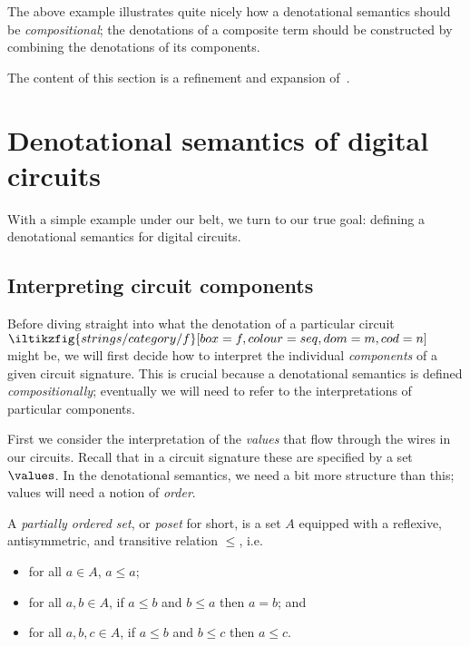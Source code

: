 The above example illustrates quite nicely how a denotational semantics should
be \emph{compositional}; the denotations of a composite term should be
constructed by combining the denotations of its components.

\begin{remark}
    The content of this section is a refinement and expansion
    of~\cite[Section 3]{ghica2023compositional}.
\end{remark}

\section{Denotational semantics of digital circuits}

With a simple example under our belt, we turn to our true goal: defining a
denotational semantics for digital circuits.

\subsection{Interpreting circuit components}

Before diving straight into what the denotation of a particular circuit \(
    \iltikzfig{strings/category/f}[box=f,colour=seq,dom=m,cod=n]
\) might be, we will first decide how to interpret the individual
\emph{components} of a given circuit signature.
This is crucial because a denotational semantics is defined
\emph{compositionally}; eventually we will need to refer to the interpretations
of particular components.

First we consider the interpretation of the \emph{values} that flow through the
wires in our circuits.
Recall that in a circuit signature these are specified by a set \(\values\).
In the denotational semantics, we need a bit more structure than this; values
will need a notion of \emph{order}.

\begin{definition}
    A \emph{partially ordered set}, or \emph{poset} for short, is a set \(A\)
    equipped with a reflexive, antisymmetric, and transitive relation \(\leq\),
    i.e.\
    \begin{itemize}
        \item for all \(a \in A\), \(a \leq a\);
        \item for all \(a, b \in A\), if \(a \leq b\) and \(b \leq a\) then
                \(a = b\); and
        \item for all \(a, b, c \in A\), if \(a \leq b\) and \(b \leq c\) then
                \(a \leq c\).
    \end{itemize}
\end{definition}

